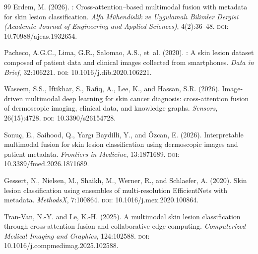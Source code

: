 \documentclass[12pt, a4paper]{article}
\begin{document}
\begin{thebibliography}{99}
Erdem, M. (2026).
: Cross-attention--based multimodal fusion with metadata for skin lesion classification.
\newblock \emph{Alfa M\"uhendislik ve Uygulamal{\i} Bilimler Dergisi (Academic Journal of Engineering and Applied Sciences)}, 4(2):36--48.
\newblock \textsc{doi}: 10.70988/ajeas.1932654.

Pacheco, A.G.C., Lima, G.R., Salomao, A.S., et~al. (2020).
: A skin lesion dataset composed of patient data and clinical images collected from smartphones.
\newblock \emph{Data in Brief}, 32:106221.
\newblock \textsc{doi}: 10.1016/j.dib.2020.106221.

Waseem, S.S., Iftikhar, S., Rafiq, A., Lee, K., and Hassan, S.R. (2026).
\newblock Image-driven multimodal deep learning for skin cancer diagnosis: cross-attention fusion of dermoscopic imaging, clinical data, and knowledge graphs.
\newblock \emph{Sensors}, 26(15):4728.
\newblock \textsc{doi}: 10.3390/s26154728.

Sonu\c{c}, E., Saihood, Q., Yarg{\i} Baydilli, Y., and \"Ozcan, E. (2026).
\newblock Interpretable multimodal fusion for skin lesion classification using dermoscopic images and patient metadata.
\newblock \emph{Frontiers in Medicine}, 13:1871689.
\newblock \textsc{doi}: 10.3389/fmed.2026.1871689.

Gessert, N., Nielsen, M., Shaikh, M., Werner, R., and Schlaefer, A. (2020).
\newblock Skin lesion classification using ensembles of multi-resolution {EfficientNets} with metadata.
\newblock \emph{MethodsX}, 7:100864.
\newblock \textsc{doi}: 10.1016/j.mex.2020.100864.

Tran-Van, N.-Y. and Le, K.-H. (2025).
\newblock A multimodal skin lesion classification through cross-attention fusion and collaborative edge computing.
\newblock \emph{Computerized Medical Imaging and Graphics}, 124:102588.
\newblock \textsc{doi}: 10.1016/j.compmedimag.2025.102588.

\end{thebibliography}
\end{document}
